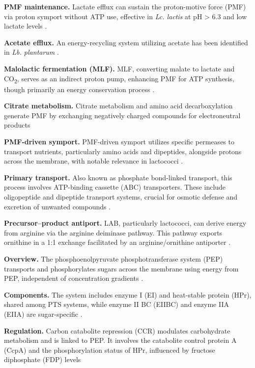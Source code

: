 
\textbf{PMF maintenance.} Lactate efflux can sustain the proton-motive force (PMF) via proton symport without ATP use, effective in \textit{Lc. lactis} at pH > 6.3 and low lactate levels \cite*{L3-LAB}.

\textbf{Acetate efflux.} An energy-recycling system utilizing acetate has been identified in \textit{Lb. plantarum} \cite*{L3-LAB}.

\textbf{Malolactic fermentation (MLF).} MLF, converting malate to lactate and CO\textsubscript{2}, serves as an indirect proton pump, enhancing PMF for ATP synthesis, though primarily an energy conservation process \cite*{L3-LAB}.

\textbf{Citrate metabolism.} Citrate metabolism and amino acid decarboxylation generate PMF by exchanging negatively charged compounds for electroneutral products \cite*{L3-LAB}

\textbf{PMF-driven symport.} PMF-driven symport utilizes specific permeases to transport nutrients, particularly amino acids and dipeptides, alongside protons across the membrane, with notable relevance in lactococci \cite*{L3-LAB}.

\textbf{Primary transport.} Also known as phosphate bond-linked transport, this process involves ATP-binding cassette (ABC) transporters. These include oligopeptide and dipeptide transport systems, crucial for osmotic defense and excretion of unwanted compounds \cite*{L3-LAB}.

\textbf{Precursor–product antiport.} LAB, particularly lactococci, can derive energy from arginine via the arginine deiminase pathway. This pathway exports ornithine in a 1:1 exchange facilitated by an arginine/ornithine antiporter \cite*{L3-LAB}.


\textbf{Overview.} The phosphoenolpyruvate
phosphotransferase system (PEP) transports and phosphorylates sugars across the membrane using energy from PEP, independent of concentration gradients \cite*{L3-LAB}.

\textbf{Components.} The system includes enzyme I (EI) and heat-stable protein (HPr), shared among PTS systems, while enzyme II BC (EIIBC) and enzyme IIA (EIIA) are sugar-specific \cite*{L3-LAB}.

\textbf{Regulation.} Carbon catabolite repression (CCR) modulates carbohydrate metabolism and is linked to PEP. It involves the catabolite control protein A (CcpA) and the phosphorylation status of HPr, influenced by fructose diphosphate (FDP) levels \cite*{L3-LAB}

